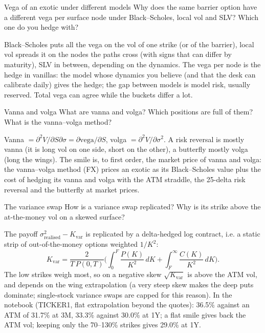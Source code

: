 \begin{question}{\Theory {}}{Vega of an exotic under different models}
Why does the same barrier option have a different vega per surface node under Black--Scholes, local vol and SLV?
Which one do you hedge with?
\end{question}
\begin{answer}
Black--Scholes puts all the vega on the vol of one strike (or of the barrier), local vol spreads it on the nodes the
paths cross (with signs that can differ by maturity), SLV in between, depending on the dynamics. The vega per node is
the hedge in vanillas: the model whose dynamics you believe (and that the desk can calibrate daily) gives the hedge;
the gap between models is model risk, usually reserved. Total vega can agree while the buckets differ a lot.
\end{answer}

\begin{question}{\Theory {}}{Vanna and volga}
What are vanna and volga? Which positions are full of them? What is the vanna--volga method?
\end{question}
\begin{answer}
Vanna $= \partial^2V/\partial S\partial\sigma = \partial\text{vega}/\partial S$, volga $= \partial^2V/\partial\sigma^2$. A risk reversal is mostly
vanna (it is long vol on one side, short on the other), a butterfly mostly volga (long the wings). The smile is, to first
order, the market price of vanna and volga: the vanna--volga method (FX) prices an exotic as its Black--Scholes value
plus the cost of hedging its vanna and volga with the ATM straddle, the 25-delta risk reversal and the butterfly at
market prices.
\end{answer}

\begin{question}{\Theory \Practice {}}{The variance swap}
How is a variance swap replicated? Why is its strike above the at-the-money vol on a skewed surface?
\end{question}
\begin{answer}
The payoff $\sigma^2_{\text{realised}} - K_{\text{var}}$ is replicated by a delta-hedged log contract, i.e. a static strip of
out-of-the-money options weighted $1/K^2$:
\[
  K_{\text{var}} = \frac{2}{T\,P(0,T)}\Big(\int_0^F \frac{P(K)}{K^2}\,dK + \int_F^\infty \frac{C(K)}{K^2}\,dK\Big).
\]
The low strikes weigh most, so on a negative skew $\sqrt{K_{\text{var}}}$ is above the ATM vol, and depends on the wing
extrapolation (a very steep skew makes the deep puts dominate; single-stock variance swaps are capped for this
reason). In the notebook (TICKER1, flat extrapolation beyond the quotes): 36.5\% against an ATM of 31.7\% at 3M, 33.3\%
against 30.0\% at 1Y; a flat smile gives back the ATM vol; keeping only the 70--130\% strikes gives 29.0\% at 1Y.
\end{answer}

